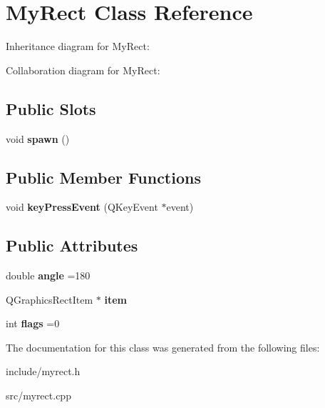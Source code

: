\hypertarget{classMyRect}{}\section{My\+Rect Class Reference}
\label{classMyRect}


Inheritance diagram for My\+Rect\+:


Collaboration diagram for My\+Rect\+:
\subsection*{Public Slots}
\begin{DoxyCompactItemize}
\item 
\mbox{\label{classMyRect_a1debaa06842d3fa78135cf63d2134ef7}} 
void {\bfseries spawn} ()
\end{DoxyCompactItemize}
\subsection*{Public Member Functions}
\begin{DoxyCompactItemize}
\item 
\mbox{\label{classMyRect_a557cdd7d9e409375ba1c85be6adae367}} 
void {\bfseries key\+Press\+Event} (Q\+Key\+Event $\ast$event)
\end{DoxyCompactItemize}
\subsection*{Public Attributes}
\begin{DoxyCompactItemize}
\item 
\mbox{\label{classMyRect_a10169f00ef1faf8efab9f7fbdd7b4f36}} 
double {\bfseries angle} =180
\item 
\mbox{\label{classMyRect_adcf31964c16bedea5a7d99cee4014192}} 
Q\+Graphics\+Rect\+Item $\ast$ {\bfseries item}
\item 
\mbox{\label{classMyRect_aa3f85c475abc68229de0eea1bde1fc76}} 
int {\bfseries flags} =0
\end{DoxyCompactItemize}


The documentation for this class was generated from the following files\+:\begin{DoxyCompactItemize}
\item 
include/myrect.\+h\item 
src/myrect.\+cpp\end{DoxyCompactItemize}

